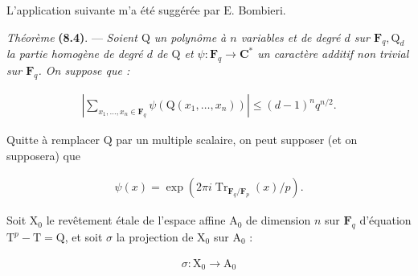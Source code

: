 \documentclass[10pt,leqno]{article}
\begin{document}
\noindent L'application suivante m'a été suggérée par \(\mathrm{E}\). Bombieri.\par

\noindent \emph{Théorème} \textbf{(8.4)}. — {\itshape Soient \(\mathrm{Q}\) un polynôme à \(n\) variables et de degré \(d\) sur \(\mathbf{F}_{q}, \mathrm{Q}_{d}\) la partie homogène de degré \(d\) de \(\mathrm{Q}\) et \(\psi  : \mathbf{F}_{q} \longrightarrow  \mathbf{C}^{*}\) un caractère additif non trivial sur \(\mathbf{F}_{q}\). On suppose que :}\par

\par

\clearpage

\label{physical-32}

\par

\begin{equation*}\begin{gathered}|\sum _{x_{1},\ldots ,x_{n} \in  \mathbf{F}_{q}} \psi (\mathrm{Q}(x_{1},\ldots ,x_{n}))| \leq  (d-1)^{n} q^{n/2}.\end{gathered}\end{equation*}

\noindent Quitte à remplacer \(\mathrm{Q}\) par un multiple scalaire, on peut supposer (et on supposera) que\par

\begin{equation*}\begin{gathered}\psi (x) = \operatorname{exp}(2\pi i \operatorname{Tr}_{\mathbf{F}_{q}/\mathbf{F}_{p}}(x)/p).\end{gathered}\tag{8.4.1}\end{equation*}

\noindent Soit \(\mathrm{X}_{0}\) le revêtement étale de l'espace affine \(\mathrm{A}_{0}\) de dimension \(n\) sur \(\mathbf{F}_{q}\) d'équation \(\mathrm{T}^{p} - \mathrm{T} = \mathrm{Q}\), et soit \(\sigma \) la projection de \(\mathrm{X}_{0}\) sur \(\mathrm{A}_{0}\) :\par

\begin{equation*}\begin{gathered}\sigma  : \mathrm{X}_{0} \longrightarrow  \mathrm{A}_{0}\end{gathered}\end{equation*}
\end{document}
